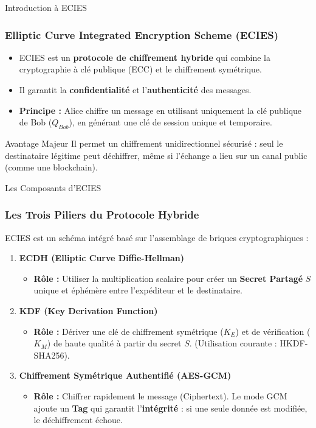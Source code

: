 
\begin{frame}{Introduction à ECIES}
\frametitle{Elliptic Curve Integrated Encryption Scheme (ECIES)}

\begin{itemize}
    \item ECIES est un \textbf{protocole de chiffrement hybride} qui combine la cryptographie à clé publique (ECC) et le chiffrement symétrique.
    \item Il garantit la \textbf{confidentialité} et l'\textbf{authenticité} des messages.
    \item \textbf{Principe :} Alice chiffre un message en utilisant uniquement la clé publique de Bob ($Q_{Bob}$), en générant une clé de session unique et temporaire.
\end{itemize}

\begin{block}{Avantage Majeur}
    Il permet un chiffrement unidirectionnel sécurisé : seul le destinataire légitime peut déchiffrer, même si l'échange a lieu sur un canal public (comme une blockchain).
\end{block}
\end{frame}

\begin{frame}{Les Composants d'ECIES}
\frametitle{Les Trois Piliers du Protocole Hybride}

ECIES est un schéma intégré basé sur l'assemblage de briques cryptographiques :

\begin{enumerate}
    \item \textbf{ECDH (Elliptic Curve Diffie-Hellman)}
    \begin{itemize}
        \item \textbf{Rôle :} Utiliser la multiplication scalaire pour créer un \textbf{Secret Partagé} $S$ unique et éphémère entre l'expéditeur et le destinataire.
    \end{itemize}
    \item \textbf{KDF (Key Derivation Function)}
    \begin{itemize}
        \item \textbf{Rôle :} Dériver une clé de chiffrement symétrique ($K_E$) et de vérification ($K_M$) de haute qualité à partir du secret $S$. (Utilisation courante : HKDF-SHA256).
    \end{itemize}
    \item \textbf{Chiffrement Symétrique Authentifié (AES-GCM)}
    \begin{itemize}
        \item \textbf{Rôle :} Chiffrer rapidement le message (Ciphertext). Le mode GCM ajoute un \textbf{Tag} qui garantit l'\textbf{intégrité} : si une seule donnée est modifiée, le déchiffrement échoue.
    \end{itemize}
\end{enumerate}
\end{frame}

